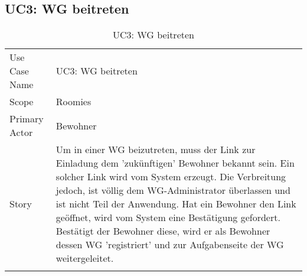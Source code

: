 \subsection{UC3: WG beitreten}
\begin{table}[H]
	\tablestyle
	\tablealtcolored
	\begin{tabularx}{\textwidth}{lX}
		\tablebody
			Use Case Name &
			UC3: WG beitreten
			\tabularnewline
			Scope &
			Roomies
			\tabularnewline
			Primary Actor &
			Bewohner
			\tabularnewline
			Story &
			Um in einer WG beizutreten, muss der Link zur Einladung dem 'zukünftigen' Bewohner bekannt sein. Ein solcher Link wird vom System erzeugt. Die Verbreitung jedoch, ist völlig dem WG-Administrator überlassen und ist nicht Teil der Anwendung. Hat ein Bewohner den Link geöffnet, wird vom System eine Bestätigung gefordert. Bestätigt der Bewohner diese, wird er als Bewohner dessen WG 'registriert' und zur Aufgabenseite der WG weitergeleitet.
			\tabularnewline
		\tableend
	\end{tabularx}
	\caption{UC3: WG beitreten}
\end{table}


